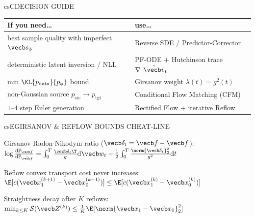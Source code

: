 \documentclass[../../../../master.tex]{subfiles}
\begin{document}
\begin{cscolumns}
\begin{cscard}{csC}{DECISION GUIDE}
  \renewcommand{\arraystretch}{1.22}\small
  \begin{tabular}{@{}>{\raggedright\arraybackslash}p{3.1cm}>{\raggedright\arraybackslash}p{4.6cm}@{}}
    \textbf{If you need\ldots} & \textbf{use\ldots}\\ \hline
    best sample quality with imperfect $\vecb s_\phi$ & Reverse SDE / Predictor-Corrector\\
    deterministic latent inversion / NLL & PF-ODE + Hutchinson trace $\nabla\!\cdot\!\tilde{\vecb v}_t$\\
    min $\KL{p_{\mathrm{data}}}{p_\phi}$ bound & Girsanov weight $\lambda(t)=g^2(t)$\\
    non-Gaussian source $p_{\mathrm{src}}\to p_{\mathrm{tgt}}$ & Conditional Flow Matching (CFM)\\
    $1$--$4$ step Euler generation & Rectified Flow + iterative Reflow\\
  \end{tabular}
\end{cscard}

\begin{cscard}{csE}{GIRSANOV \& REFLOW BOUNDS CHEAT-LINE}
  \begin{csbul}
    \item Girsanov Radon-Nikodym ratio ($\vecb\delta_t=\vecb f-\tilde{\vecb f}$):
      $\log\frac{\mathrm{d}\mathbb P_{\vecb f}}{\mathrm{d}\mathbb P_{\tilde{\vecb f}}}=\int_0^T\frac{\vecb\delta_t\T}{g}\mathrm{d}\vecb w_t-\frac{1}{2}\int_0^T\frac{\norm{\vecb\delta_t}_2^2}{g^2}\mathrm{d}t$
    \item Reflow convex transport cost never increases: $\E[c(\vecb x_1^{(k+1)}-\vecb x_0^{(k+1)})]\le\E[c(\vecb x_1^{(k)}-\vecb x_0^{(k)})]$
    \item Straightness decay after $K$ reflows: $\min_{k\le K}\mathcal S(\vecb Z^{(k)})\le\frac{1}{K}\E[\norm{\vecb x_1-\vecb x_0}_2^2]$
  \end{csbul}
\end{cscard}


\end{cscolumns}
\end{document}
